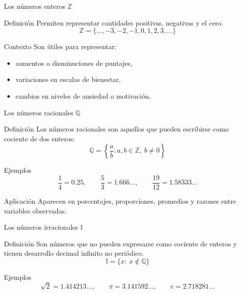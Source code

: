 \documentclass[handout,aspectratio=169,10pt]{beamer}
\begin{document}
	\begin{frame}{Los números enteros \(\mathbb{Z}\)}
		\begin{block}{Definición}
			Permiten representar cantidades positivas, negativas y el cero.
			\[
			\mathbb{Z}=\{\dots,-3,-2,-1,0,1,2,3,\dots\}
			\]
		\end{block}
		
		\begin{exampleblock}{Contexto}
			Son útiles para representar:
			\begin{itemize}
				\item aumentos o disminuciones de puntajes,
				\item variaciones en escalas de bienestar,
				\item cambios en niveles de ansiedad o motivación.
			\end{itemize}
		\end{exampleblock}
	\end{frame}
	
	\begin{frame}{Los números racionales \(\mathbb{Q}\)}
		\begin{block}{Definición}
			Los números racionales son aquellos que pueden escribirse como cociente de dos enteros:
			\[
			\mathbb{Q}=\left\{\frac{a}{b}: a,b\in\mathbb{Z},\ b\neq 0\right\}
			\]
		\end{block}
		
		\begin{exampleblock}{Ejemplos}
			\[
			\frac14=0.25,\qquad \frac53=1.666\dots,\qquad \frac{19}{12}=1.58333\dots
			\]
		\end{exampleblock}
		
		\begin{block}{Aplicación}
			Aparecen en porcentajes, proporciones, promedios y razones entre variables observadas.
		\end{block}
	\end{frame}
	
	\begin{frame}{Los números irracionales \(\mathbb{I}\)}
		\begin{block}{Definición}
			Son números que no pueden expresarse como cociente de enteros y tienen desarrollo decimal infinito no periódico.
			\[
			\mathbb{I}=\{x:\ x\notin\mathbb{Q}\}
			\]
		\end{block}
		
		\begin{exampleblock}{Ejemplos}
			\[
			\sqrt{2}=1.414213\dots,\qquad \pi=3.141592\dots,\qquad e=2.718281\dots
			\]
		\end{exampleblock}
	\end{frame}
	
\end{document}
